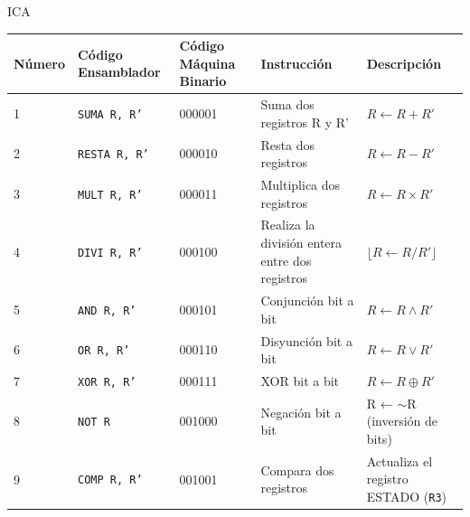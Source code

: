 ICA\documentclass{article}
\begin{document}
\begin{longtable}{|p{}|p{}|p{}|p{}|p{}|}
  \hline
  \textbf{Número} & \textbf{Código Ensamblador} & \textbf{Código Máquina Binario} & \textbf{Instrucción}                                               & \textbf{Descripción}                       \\
  \hline
  1               & \texttt{SUMA R, R'}         & 000001                          & Suma dos registros R y R'                                          & $R \leftarrow  R + R'$                     \\
  \hline
  2               & \texttt{RESTA R, R'}        & 000010                          & Resta dos registros                                                & $R \leftarrow R - R'$                      \\
  \hline
  3               & \texttt{MULT R, R'}         & 000011                          & Multiplica dos registros                                           & $R \leftarrow R \times R'$                 \\
  \hline
  4               & \texttt{DIVI R, R'}         & 000100                          & Realiza la división entera entre dos registros                     & $\lfloor R \leftarrow R / R' \rfloor$      \\
  \hline
  5               & \texttt{AND R, R'}          & 000101                          & Conjunción bit a bit                                               & $R \leftarrow R \wedge R'$                 \\
  \hline
  6               & \texttt{OR R, R'}           & 000110                          & Disyunción bit a bit                                               & $R \leftarrow R \vee R'$                   \\
  \hline
  7               & \texttt{XOR R, R'}          & 000111                          & XOR bit a bit                                                      & $R \leftarrow R \oplus R'$                 \\
  \hline
  8               & \texttt{NOT R}              & 001000                          & Negación bit a bit                                                 & R ← $\sim$R (inversión de bits)            \\
  \hline
  9               & \texttt{COMP R, R'}         & 001001                          & Compara dos registros                                              & Actualiza el registro ESTADO (\texttt{R3}) \\

\end{longtable}
\end{document}
